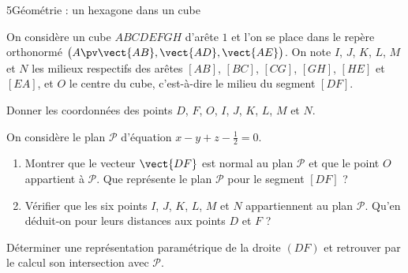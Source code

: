 \begin{exoBac}{5}{Géométrie : un hexagone dans un cube}
\begin{codecote}[0.6]
On considère un cube $ABCDEFGH$ d'arête $1$ et l'on se place dans le repère orthonormé $\big(A\pv\vect{AB},\vect{AD},\vect{AE}\big)$. On note
$I$, $J$, $K$, $L$, $M$ et $N$ les milieux respectifs des arêtes $[AB]$, $[BC]$, $[CG]$, $[GH]$, $[HE]$ et $[EA]$, et $O$ le centre du
cube, c'est-à-dire le milieu du segment $[DF]$.
\begin{questions}
  \item Donner les coordonnées des points $D$, $F$, $O$, $I$, $J$, $K$, $L$, $M$ et $N$.
  \item On considère le plan $\mathcal{P}$ d'équation $x-y+z-\frac12=0$.
    \begin{enumerate}[label=\alph*),leftmargin=1.4em,itemsep=0.4mm,topsep=0.4mm]
      \item Montrer que le vecteur $\vect{DF}$ est normal au plan $\mathcal{P}$ et que le point $O$ appartient à $\mathcal{P}$. Que
        représente le plan $\mathcal{P}$ pour le segment $[DF]$ ?
      \item Vérifier que les six points $I$, $J$, $K$, $L$, $M$ et $N$ appartiennent au plan $\mathcal{P}$. Qu'en déduit-on pour leurs
        distances aux points $D$ et $F$ ?
    \end{enumerate}
\end{questions}
\cote
\centering
{}
\end{codecote}
\begin{questions}[start=3]
  \item Déterminer une représentation paramétrique de la droite $(DF)$ et retrouver par le calcul son intersection avec $\mathcal{P}$.

\end{questions}
\end{exoBac}
